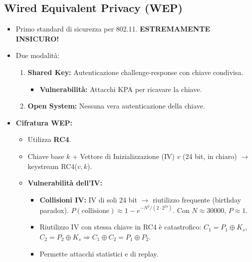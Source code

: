 \subsection{Wired Equivalent Privacy (WEP)}
\begin{itemize}
    \item Primo standard di sicurezza per 802.11. \textbf{ESTREMAMENTE INSICURO!}
    \item Due modalità:
    \begin{enumerate}
        \item \textbf{Shared Key:} Autenticazione challenge-response con chiave condivisa.
        \begin{itemize}
            \item \textbf{Vulnerabilità:} Attacchi KPA per ricavare la chiave.
        \end{itemize}
        \item \textbf{Open System:} Nessuna vera autenticazione della chiave.
    \end{enumerate}
    \item \textbf{Cifratura WEP:}
    \begin{itemize}
        \item Utilizza \textbf{RC4}.
        \item Chiave base $k$ + Vettore di Inizializzazione (IV) $v$ (24 bit, in chiaro) $\rightarrow$ keystream RC4($v,k$).
        \item \textbf{Vulnerabilità dell'IV:}
        \begin{itemize}
            \item \textbf{Collisioni IV:} IV di soli 24 bit $\rightarrow$ riutilizzo frequente (birthday paradox).
            $P(\text{collisione}) \approx 1 - e^{-N^2 / (2 \cdot 2^{24})}$. Con $N \approx 30000$, $P \approx 1$.
            \item Riutilizzo IV con stessa chiave in RC4 è catastrofico: $C_1 = P_1 \oplus K_s$, $C_2 = P_2 \oplus K_s \Rightarrow C_1 \oplus C_2 = P_1 \oplus P_2$.
            \item Permette attacchi statistici e di replay.
        \end{itemize}
    \end{itemize}
\end{itemize}

